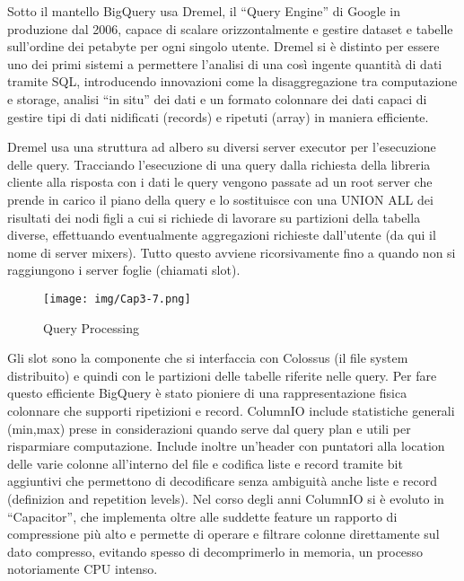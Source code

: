 \documentclass[a4paper,12pt]{report}
\begin{document}
\noindent
Sotto il mantello BigQuery usa Dremel, il “Query Engine” di Google in produzione dal 2006, capace di scalare orizzontalmente e gestire dataset e tabelle sull’ordine dei petabyte per ogni singolo utente. Dremel si è distinto per essere uno dei primi sistemi a permettere l’analisi di una così ingente quantità di dati tramite SQL, introducendo innovazioni come la disaggregazione tra computazione e storage, analisi “in situ” dei dati e un formato colonnare dei dati capaci di gestire tipi di dati nidificati (records) e ripetuti (array) in maniera efficiente. 

\noindent
Dremel usa una struttura ad albero su diversi server executor per l’esecuzione delle query. Tracciando l’esecuzione di una query dalla richiesta della libreria cliente alla risposta con i dati le query vengono passate ad un root server che prende in carico il piano della query e lo sostituisce con una UNION ALL dei risultati dei nodi figli a cui si richiede di lavorare su partizioni della tabella diverse, effettuando eventualmente aggregazioni richieste dall’utente (da qui il nome di server mixers). Tutto questo avviene ricorsivamente fino a quando non si raggiungono i server foglie (chiamati slot).

\begin{figure}[h]
    \centering
    \texttt{[image: img/Cap3-7.png]}
    \caption{Query Processing}
\end{figure}

Gli slot sono la componente che si interfaccia con Colossus (il file system distribuito) e quindi con le partizioni delle tabelle riferite nelle query. Per fare questo efficiente BigQuery è stato pioniere di una rappresentazione fisica colonnare che supporti ripetizioni e record. ColumnIO include statistiche generali (min,max) prese in considerazioni quando serve dal query plan e utili per risparmiare computazione. Include inoltre un’header con puntatori alla location delle varie colonne all’interno del file e codifica liste e record tramite bit aggiuntivi che permettono di decodificare senza ambiguità anche liste e record (definizion and repetition levels). Nel corso degli anni ColumnIO si è evoluto in “Capacitor”, che implementa oltre alle suddette feature un rapporto di compressione più alto e permette di operare e filtrare colonne direttamente sul dato compresso, evitando spesso di decomprimerlo in memoria, un processo notoriamente CPU intenso.
\end{document}
